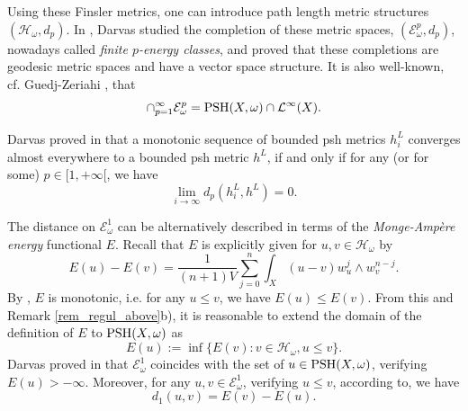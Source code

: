 \documentclass[12pt]{article}
\numberwithin{equation}{section}
\theoremstyle{theorem}
\theoremstyle{definition}
\theoremstyle{remark}
\begin{document}
	\par 
	Using these Finsler metrics, one can introduce path length metric structures $(\mathcal{H}_{\omega}, d_p)$. 
	In \cite{DarvasFinEnerg}, Darvas studied the completion of these metric spaces, $(\mathcal{E}_{\omega}^p, d_p)$, nowadays called \textit{finite $p$-energy classes}, and proved that these completions are geodesic metric spaces and have a vector space structure.
	It is also well-known, cf. Guedj-Zeriahi \cite[Exercise 10.2]{GuedjZeriahBook}, that
	\begin{equation}\label{eq_inter_ep}
		\cap_{p = 1}^{\infty} \mathcal{E}_{\omega}^p
		=
		{\rm{PSH}}(X, \omega) \cap \mathcal{L}^{\infty}(X).
	\end{equation}
	\par 
	Darvas proved in \cite[Proposition 4.9]{DarvasFinEnerg} that a monotonic sequence of bounded psh metrics $h^L_i$ converges almost everywhere to a bounded psh metric $h^L$, if and only if for any (or for some) $p \in [1, + \infty[$, we have 
	\begin{equation}\label{eq_darvas_conv}
		\lim_{i \to \infty} d_p(h^L_i, h^L) = 0.
	\end{equation}
	\par 
	The distance on $\mathcal{E}_{\omega}^1$ can be alternatively described in terms of the \textit{Monge-Ampère energy} functional $E$.
	Recall that $E$ is explicitly given for $u, v \in \mathcal{H}_{\omega}$ by
	\begin{equation}\label{eq_energy}
		E(u) - E(v)
		=
		\frac{1}{(n + 1) V}
		\sum_{j = 0}^{n} \int_X (u - v) w_u^j \wedge w_v^{n - j}.
	\end{equation}
	By \cite[Proposition 10.14]{GuedjZeriahBook}, $E$ is monotonic, i.e. for any $u \leq v$, we have $E(u) \leq E(v)$.
	From this and Remark \ref{rem_regul_above}b), it is reasonable to extend the domain of the definition of $E$ to ${\rm{PSH}}(X, \omega)$ as
	\begin{equation}\label{eq_energy_ext}
		E(u) :=
		\inf 
		\Big \{ 
		 E(v) : v \in \mathcal{H}_{\omega}, u \leq v
		\Big \}.
	\end{equation}
	Darvas proved in \cite{DarvasFinEnerg} that $\mathcal{E}_{\omega}^1$ coincides with the set of $u \in {\rm{PSH}}(X, \omega)$, verifying $E(u) > - \infty$. 
	Moreover, for any $u, v \in \mathcal{E}_{\omega}^1$, verifying $u \leq v$, according to\cite[Corollary 4.14]{DarvasFinEnerg}, we have
	\begin{equation}\label{eq_d1_ener}
		d_1(u, v) = E(v) - E(u).
	\end{equation}
\end{document}
